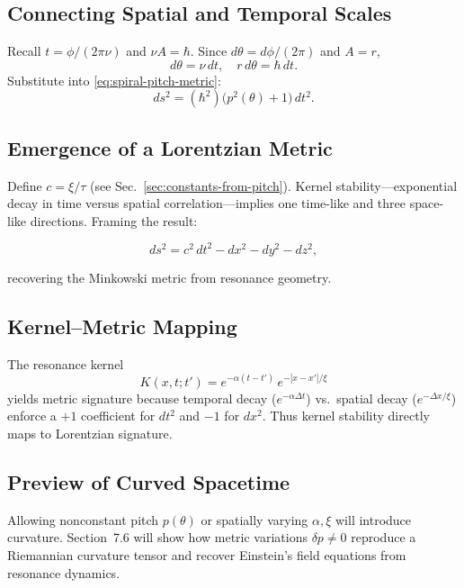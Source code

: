 \subsection{Connecting Spatial and Temporal Scales}
\label{sec:space-time-link}

Recall \(t=\phi/(2\pi\nu)\) and \(\nu A=\hbar\).  Since \(d\theta=d\phi/(2\pi)\) and \(A=r\),
\[
  d\theta = \nu\,dt,\quad r\,d\theta = \hbar\,dt.
\]
Substitute into \eqref{eq:spiral-pitch-metric}:
\begin{equation}
  ds^2 = (\hbar^2)\bigl(p^2(\theta)+1\bigr)\,dt^2.
  \label{eq:dt-substitution}
\end{equation}

\subsection{Emergence of a Lorentzian Metric}
\label{sec:lorentz-metric}

Define \(c=\xi/\tau\) (see Sec.~\ref{sec:constants-from-pitch}).  Kernel stability—exponential decay in time versus spatial correlation—implies one time-like and three space-like directions.  Framing the result:
\begin{framed}
\begin{equation}
  ds^2 = c^2\,dt^2 - dx^2 - dy^2 - dz^2,
  \label{eq:minkowski-emergent}
\end{equation}
\end{framed}
recovering the Minkowski metric from resonance geometry.

\subsection{Kernel–Metric Mapping}
\label{sec:kernel-metric}

The resonance kernel
\[
  K(x,t;t') = e^{-\alpha(t-t')}\,e^{-|x-x'|/\xi}
\]
yields metric signature because temporal decay (\(e^{-\alpha\Delta t}\)) vs.\ spatial decay (\(e^{-\Delta x/\xi}\)) enforce a \(+1\) coefficient for \(dt^2\) and \(-1\) for \(dx^2\).  Thus kernel stability directly maps to Lorentzian signature.

\subsection{Preview of Curved Spacetime}
\label{sec:curvature-preview}

Allowing nonconstant pitch \(p(\theta)\) or spatially varying \(\alpha,\xi\) will introduce curvature.  Section~7.6 will show how metric variations \(\delta p\neq0\) reproduce a Riemannian curvature tensor and recover Einstein’s field equations from resonance dynamics.

